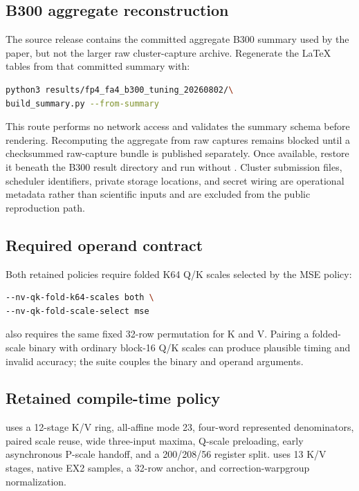 \subsection{B300 aggregate reconstruction}

The source release contains the committed aggregate B300 summary used by the
paper, but not the larger raw cluster-capture archive. Regenerate the LaTeX
tables from that committed summary with:
\begin{lstlisting}[language=bash]
python3 results/fp4_fa4_b300_tuning_20260802/\
build_summary.py --from-summary
\end{lstlisting}
This route performs no network access and validates the summary schema before
rendering. Recomputing the aggregate from raw captures remains blocked until a
checksummed raw-capture bundle is published separately. Once available,
restore it beneath the B300 result directory and run
 without . Cluster submission
files, scheduler identifiers, private storage locations, and secret wiring are
operational metadata rather than scientific inputs and are excluded from the
public reproduction path.

\subsection{Required operand contract}

Both retained policies require folded K64 Q/K scales selected by the MSE
policy:
\begin{lstlisting}[language=bash]
--nv-qk-fold-k64-scales both \
--nv-qk-fold-scale-select mse
\end{lstlisting}
 also requires the same fixed 32-row permutation for K and V.
Pairing a folded-scale binary with ordinary block-16 Q/K scales can produce
plausible timing and invalid accuracy; the suite couples the binary and
operand arguments.

\subsection{Retained compile-time policy}

 uses a 12-stage K/V ring, all-affine mode 23, four-word
represented denominators, paired scale reuse, wide three-input maxima,
Q-scale preloading, early asynchronous P-scale handoff, and a 200/208/56
register split. \code{Accurate} uses 13 K/V stages, native EX2 samples, a
32-row anchor, and correction-warpgroup normalization.

